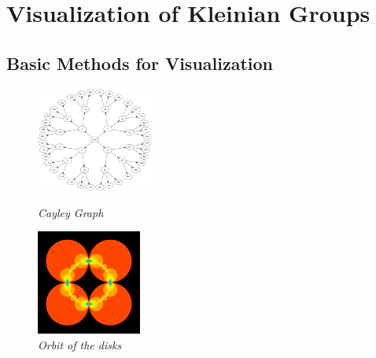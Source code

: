 
\section{Visualization of Kleinian Groups}

\subsection{Basic Methods for Visualization}

\begin{figure}[htbp]
 \begin{minipage}[t]{0.5\hsize}
  \center
  \includegraphics[height=1.35in, keepaspectratio]{img/cayleyGraphabcd.png}
  \caption{\textit{Cayley Graph}}
  \label{fig:cayleyGraph}
  \hspace*{\fill}
 \end{minipage}
 \begin{minipage}[t]{0.5\hsize}
  \center
  \includegraphics[height=1.35in, keepaspectratio]{img/preparation/basic/circleOrbit.png}
  \caption{\textit{Orbit of the disks}}
  \label{fig:circOrbit}
  \hspace*{\fill}
 \end{minipage}
\end{figure}

